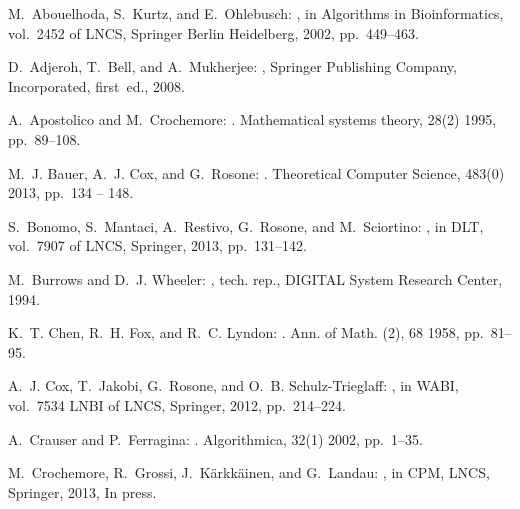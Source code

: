 \documentclass[envcountsame,runningheads]{llncs}
\begin{document}
\begin{thebibliography}{10}

{\sc M.~Abouelhoda, S.~Kurtz, and E.~Ohlebusch}:
, in Algorithms in Bioinformatics, vol.~2452 of LNCS, Springer
  Berlin Heidelberg, 2002, pp.~449--463.

{\sc D.~Adjeroh, T.~Bell, and A.~Mukherjee}:
, Springer Publishing Company, Incorporated, first~ed.,
  2008.

{\sc A.~Apostolico and M.~Crochemore}:
.
\newblock Mathematical systems theory, 28(2) 1995, pp.~89--108.

{\sc M.~J. Bauer, A.~J. Cox, and G.~Rosone}:
.
\newblock Theoretical Computer Science, 483(0) 2013, pp.~134 -- 148.

{\sc S.~Bonomo, S.~Mantaci, A.~Restivo, G.~Rosone, and M.~Sciortino}:
, in DLT, vol.~7907 of
  LNCS, Springer, 2013, pp.~131--142.

{\sc M.~Burrows and D.~J. Wheeler}:
, tech. rep., DIGITAL
  System Research Center, 1994.

{\sc K.~T. Chen, R.~H. Fox, and R.~C. Lyndon}:
.
\newblock Ann. of Math. (2), 68 1958, pp.~81--95.

{\sc A.~J. Cox, T.~Jakobi, G.~Rosone, and O.~B. Schulz-Trieglaff}:
, in WABI, vol.~7534 LNBI of LNCS, Springer, 2012,
  pp.~214--224.

{\sc A.~Crauser and P.~Ferragina}:
.
\newblock Algorithmica, 32(1) 2002, pp.~1--35.

{\sc M.~Crochemore, R.~Grossi, J.~K\"{a}rkk\"{a}inen, and G.~Landau}:
, in CPM, LNCS, Springer, 2013, In press.


\end{thebibliography}
\end{document}
